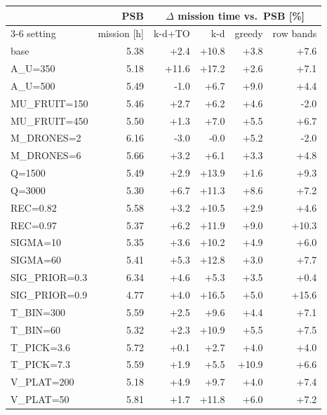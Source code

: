 \begin{tabular}{lrrrrr}
\toprule
 & PSB & \multicolumn{4}{c}{$\Delta$ mission time vs.\ PSB [\%]} \\
\cmidrule(lr){3-6}
setting & mission [h] & k-d+TO & k-d & greedy & row bands \\
\midrule
base & 5.38 & +2.4 & +10.8 & +3.8 & +7.6 \\
A\_U=350 & 5.18 & +11.6 & +17.2 & +2.6 & +7.1 \\
A\_U=500 & 5.49 & -1.0 & +6.7 & +9.0 & +4.4 \\
MU\_FRUIT=150 & 5.46 & +2.7 & +6.2 & +4.6 & -2.0 \\
MU\_FRUIT=450 & 5.50 & +1.3 & +7.0 & +5.5 & +6.7 \\
M\_DRONES=2 & 6.16 & -3.0 & -0.0 & +5.2 & -2.0 \\
M\_DRONES=6 & 5.66 & +3.2 & +6.1 & +3.3 & +4.8 \\
Q=1500 & 5.49 & +2.9 & +13.9 & +1.6 & +9.3 \\
Q=3000 & 5.30 & +6.7 & +11.3 & +8.6 & +7.2 \\
REC=0.82 & 5.58 & +3.2 & +10.5 & +2.9 & +4.6 \\
REC=0.97 & 5.37 & +6.2 & +11.9 & +9.0 & +10.3 \\
SIGMA=10 & 5.35 & +3.6 & +10.2 & +4.9 & +6.0 \\
SIGMA=60 & 5.41 & +5.3 & +12.8 & +3.0 & +7.7 \\
SIG\_PRIOR=0.3 & 6.34 & +4.6 & +5.3 & +3.5 & +0.4 \\
SIG\_PRIOR=0.9 & 4.77 & +4.0 & +16.5 & +5.0 & +15.6 \\
T\_BIN=300 & 5.59 & +2.5 & +9.6 & +4.4 & +7.1 \\
T\_BIN=60 & 5.32 & +2.3 & +10.9 & +5.5 & +7.5 \\
T\_PICK=3.6 & 5.72 & +0.1 & +2.7 & +4.0 & +4.0 \\
T\_PICK=7.3 & 5.59 & +1.9 & +5.5 & +10.9 & +6.6 \\
V\_PLAT=200 & 5.18 & +4.9 & +9.7 & +4.0 & +7.4 \\
V\_PLAT=50 & 5.81 & +1.7 & +11.8 & +6.0 & +7.2 \\
\bottomrule
\end{tabular}
